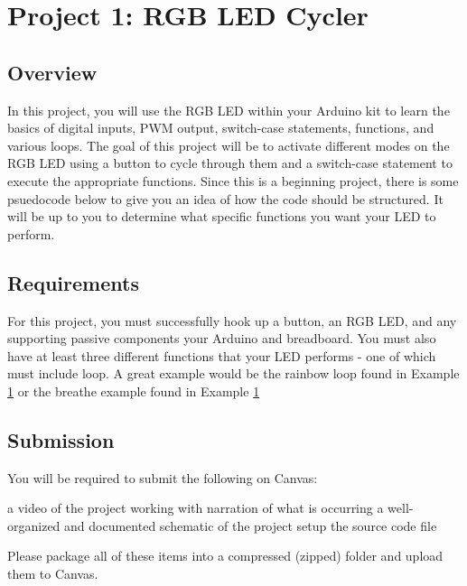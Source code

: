 %

\chapter{Project 1: RGB LED Cycler}

\section*{Overview}
In this project, you will use the RGB LED within your Arduino kit to learn the basics of digital inputs, PWM output, switch-case statements, functions, and various loops.
The goal of this project will be to activate different modes on the RGB LED using a button to cycle through them and a switch-case statement to execute the appropriate functions.
Since this is a beginning project, there is some psuedocode below to give you an idea of how the code should be structured.
It will be up to you to determine what specific functions you want your LED to perform.

\section*{Requirements}
For this project, you must successfully hook up a button, an RGB LED, and any supporting passive components your Arduino and breadboard.
You must also have at least three different functions that your LED performs - one of which must include loop. A great example would be the rainbow loop found in Example \ref{} or the breathe example found in Example \ref{} 

\section*{Submission}
You will be required to submit the following on Canvas:
\begin{outline}
    \1 a video of the project working with narration of what is occurring
    \1 a well-organized and documented schematic of the project setup
    \1 the source code file
\end{outline}
Please package all of these items into a compressed (zipped) folder and upload them to Canvas.

